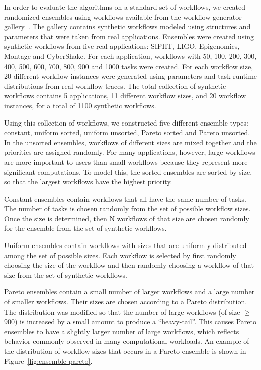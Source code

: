 \documentclass[preprint,5p]{elsarticle}
\begin{document}
In order to evaluate the algorithms on a standard set of workflows, we created
randomized ensembles using workflows available from the workflow generator
gallery~\cite{WorkflowGenerator,Silva2014}. The
gallery contains synthetic workflows modeled using structures and parameters
that were taken from real applications. Ensembles were created using synthetic
workflows from five real applications: SIPHT, LIGO, Epigenomics, Montage and
CyberShake. For each application, workflows with 50, 100, 200, 300,
400, 500, 600, 700, 800, 900 and 1000 tasks were created. For each workflow
size, 20 different workflow instances were generated using parameters and task
runtime distributions from real workflow traces. The total collection of
synthetic workflows contains 5 applications, 11 different workflow sizes, and 20
workflow instances, for a total of 1100 synthetic workflows.


Using this collection of workflows, we constructed five different ensemble types:
constant, uniform sorted, uniform unsorted, Pareto sorted and Pareto unsorted.
In the unsorted ensembles, workflows of different sizes are mixed together and
the priorities are assigned randomly.
For many applications, however, large workflows are
more important to users than small workflows because they represent more
significant computations. To model this, the sorted ensembles are sorted by
size, so that the largest workflows have the highest priority.

Constant ensembles contain workflows that all have the same number of tasks. 
The number of tasks is chosen randomly from the set of
possible workflow sizes. Once the size is determined, then N workflows of that
size are chosen randomly for the ensemble from the set of synthetic workflows.

Uniform ensembles contain workflows with sizes that are uniformly distributed
among the set of possible sizes. Each workflow 
is selected by first randomly choosing the size of the workflow
and then randomly choosing a workflow of that size from the set of
synthetic workflows.

Pareto ensembles contain a small number of larger workflows and a large number
of smaller workflows. Their sizes  
are chosen according to a Pareto distribution. The distribution was modified so
that the number of large workflows (of size $\geq$ 900) is increased by a small amount to
produce a ``heavy-tail''. This causes Pareto ensembles to have a slightly larger
number of large workflows, which reflects behavior commonly observed in many
computational workloads. 
An example of the distribution of workflow sizes that
occurs in a Pareto ensemble is shown in Figure~\ref{fig:ensemble-pareto}.
\end{document}
